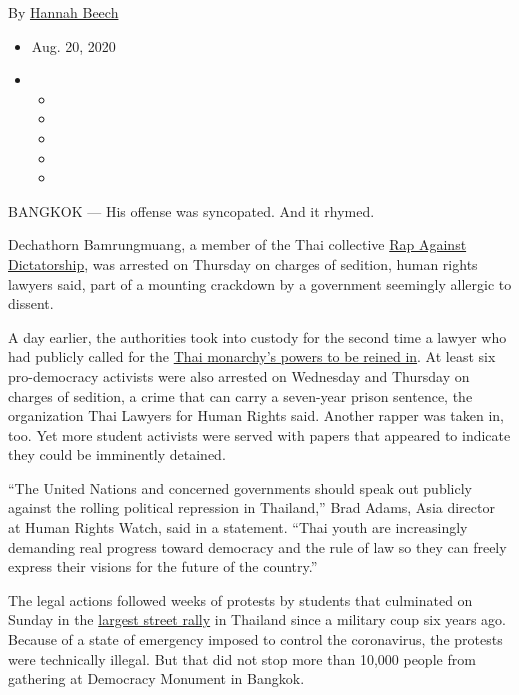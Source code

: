 By \href{https://www.nytimes3xbfgragh.onion/by/hannah-beech}{Hannah
Beech}

\begin{itemize}
\item
  Aug. 20, 2020
\item
  \begin{itemize}
  \item
  \item
  \item
  \item
  \item
  \end{itemize}
\end{itemize}

BANGKOK --- His offense was syncopated. And it rhymed.

Dechathorn Bamrungmuang, a member of the Thai collective
\href{https://www.nytimes3xbfgragh.onion/2019/02/15/world/asia/rap-video-thailand-liberate-p.html}{Rap
Against Dictatorship}, was arrested on Thursday on charges of sedition,
human rights lawyers said, part of a mounting crackdown by a government
seemingly allergic to dissent.

A day earlier, the authorities took into custody for the second time a
lawyer who had publicly called for the
\href{https://www.nytimes3xbfgragh.onion/2020/08/13/world/asia/protests-thailand-king-monarchy.html}{Thai
monarchy's powers to be reined in}. At least six pro-democracy activists
were also arrested on Wednesday and Thursday on charges of sedition, a
crime that can carry a seven-year prison sentence, the organization Thai
Lawyers for Human Rights said. Another rapper was taken in, too. Yet
more student activists were served with papers that appeared to indicate
they could be imminently detained.

``The United Nations and concerned governments should speak out publicly
against the rolling political repression in Thailand,'' Brad Adams, Asia
director at Human Rights Watch, said in a statement. ``Thai youth are
increasingly demanding real progress toward democracy and the rule of
law so they can freely express their visions for the future of the
country.''

The legal actions followed weeks of protests by students that culminated
on Sunday in the
\href{https://www.nytimes3xbfgragh.onion/2020/08/16/world/asia/thailand-protests-democracy-monarchy.html}{largest
street rally} in Thailand since a military coup six years ago. Because
of a state of emergency imposed to control the coronavirus, the protests
were technically illegal. But that did not stop more than 10,000 people
from gathering at Democracy Monument in Bangkok.

